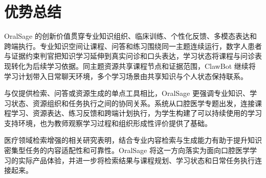 \section{优势总结}

OralSage 的创新价值贯穿专业知识组织、临床训练、个性化反馈、多模态表达和跨端执行。专业知识空间让课程、问答和练习围绕同一主题连续运行，数字人患者与证据约束判官把知识学习延伸到真实问诊和口头表达，学习状态将课程与问诊表现转化为后续学习依据。同主题资源共享课程节点和证据范围，ClawBot 继续将学习计划带入日常聊天环境，多个学习场景由共享知识与个人状态保持联系。

与仅提供检索、问答或资源生成的单点工具相比，OralSage 更强调专业知识、学习状态、资源组织和任务执行之间的协同关系。系统从口腔医学专题出发，连接课程学习、资源表达、练习反馈和跨端计划执行，为学生构建了可以持续使用的学习支持环境，也为教师观察学习过程和组织形成性评价提供了基础。

医疗领域检索增强的相关研究表明，结合专业内容检索与生成能力有助于提升知识密集型任务的内容适配性和可靠性\cite{collaco2026ft_rag}。OralSage 将这一方向落实为面向口腔医学学习的实际产品体验，并进一步将检索结果与课程规划、学习状态和日常任务执行连接起来。


